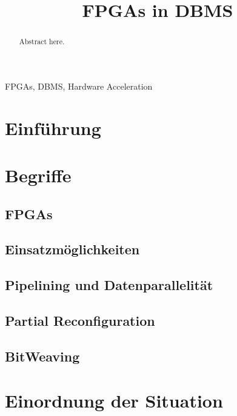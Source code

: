 \documentclass[conference]{IEEEtran}
\begin{document}
\title{FPGAs in DBMS
}

\author{
}

\maketitle

\begin{abstract}
    Abstract here.
\end{abstract}

\begin{IEEEkeywords}
    FPGAs, DBMS, Hardware Acceleration
\end{IEEEkeywords}

\section{Einführung}

\section{Begriffe}


\subsection{FPGAs}


\subsection{Einsatzmöglichkeiten}

\subsection{Pipelining und Datenparallelität}

\subsection{Partial Reconfiguration}

\subsection{BitWeaving}


\section{Einordnung der Situation}
\end{document}
